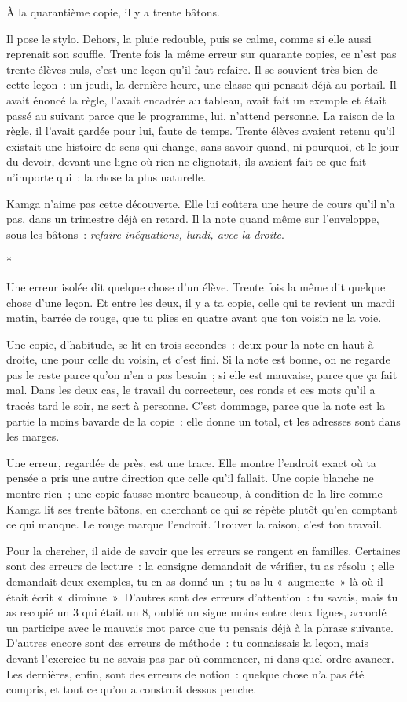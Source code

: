 \documentclass[10.5pt,twoside,openright]{book}
\newcommand{\asterisme}{\par\vspace{0.7em}\centerline{\color{gris}*\quad*\quad*}\vspace{0.7em}\par\noindent}
\begin{document}
À la quarantième copie, il y a trente bâtons.

Il pose le stylo. Dehors, la pluie redouble, puis se calme, comme si elle aussi reprenait son souffle. Trente fois la même erreur sur quarante copies, ce n’est pas trente élèves nuls, c’est une leçon qu’il faut refaire. Il se souvient très bien de cette leçon : un jeudi, la dernière heure, une classe qui pensait déjà au portail. Il avait énoncé la règle, l’avait encadrée au tableau, avait fait un exemple et était passé au suivant parce que le programme, lui, n’attend personne. La raison de la règle, il l’avait gardée pour lui, faute de temps. Trente élèves avaient retenu qu’il existait une histoire de sens qui change, sans savoir quand, ni pourquoi, et le jour du devoir, devant une ligne où rien ne clignotait, ils avaient fait ce que fait n’importe qui : la chose la plus naturelle.

Kamga n’aime pas cette découverte. Elle lui coûtera une heure de cours qu’il n’a pas, dans un trimestre déjà en retard. Il la note quand même sur l’enveloppe, sous les bâtons : \emph{refaire inéquations, lundi, avec la droite}.

\asterisme

Une erreur isolée dit quelque chose d’un élève. Trente fois la même dit quelque chose d’une leçon. Et entre les deux, il y a ta copie, celle qui te revient un mardi matin, barrée de rouge, que tu plies en quatre avant que ton voisin ne la voie.

Une copie, d’habitude, se lit en trois secondes : deux pour la note en haut à droite, une pour celle du voisin, et c’est fini. Si la note est bonne, on ne regarde pas le reste parce qu’on n’en a pas besoin ; si elle est mauvaise, parce que ça fait mal. Dans les deux cas, le travail du correcteur, ces ronds et ces mots qu’il a tracés tard le soir, ne sert à personne. C’est dommage, parce que la note est la partie la moins bavarde de la copie : elle donne un total, et les adresses sont dans les marges.

Une erreur, regardée de près, est une trace. Elle montre l’endroit exact où ta pensée a pris une autre direction que celle qu’il fallait. Une copie blanche ne montre rien ; une copie fausse montre beaucoup, à condition de la lire comme Kamga lit ses trente bâtons, en cherchant ce qui se répète plutôt qu’en comptant ce qui manque. Le rouge marque l’endroit. Trouver la raison, c’est ton travail.

Pour la chercher, il aide de savoir que les erreurs se rangent en familles. Certaines sont des erreurs de lecture : la consigne demandait de vérifier, tu as résolu ; elle demandait deux exemples, tu en as donné un ; tu as lu « augmente » là où il était écrit « diminue ». D’autres sont des erreurs d’attention : tu savais, mais tu as recopié un 3 qui était un 8, oublié un signe moins entre deux lignes, accordé un participe avec le mauvais mot parce que tu pensais déjà à la phrase suivante. D’autres encore sont des erreurs de méthode : tu connaissais la leçon, mais devant l’exercice tu ne savais pas par où commencer, ni dans quel ordre avancer. Les dernières, enfin, sont des erreurs de notion : quelque chose n’a pas été compris, et tout ce qu’on a construit dessus penche.
\end{document}
